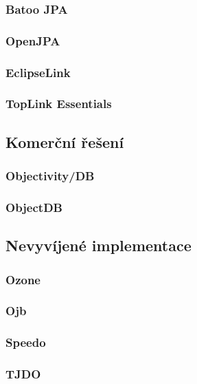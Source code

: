 \subsubsection{Batoo JPA}
\subsubsection{OpenJPA}
\subsubsection{EclipseLink}
\subsubsection{TopLink Essentials}
\subsection{Komerční řešení}
\subsubsection{Objectivity/DB}
\subsubsection{ObjectDB}
\subsection{Nevyvíjené implementace}
\subsubsection{Ozone}
\subsubsection{Ojb}
\subsubsection{Speedo}
\subsubsection{TJDO}
